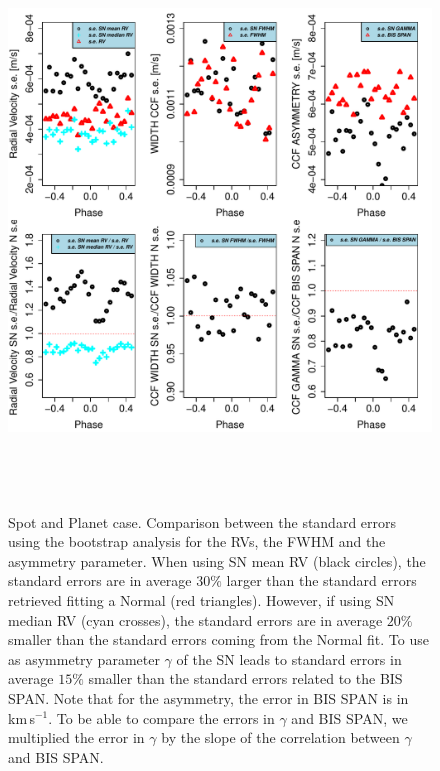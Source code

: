 \documentclass{aa}
\def\kms{\hbox{\,km\,s$^{-1}$}}       %
\begin{document}
\begin{figure}[htbp]
   \centering
\includegraphics[height = 6in]{RV_comparison_SPOT_PLANET_standard_errors.pdf} 
   \caption{Spot and Planet case. Comparison between the standard errors using the bootstrap analysis for the RVs, the FWHM and the asymmetry parameter. When using SN mean RV (black circles), the standard errors are in average $30\%$ larger than the standard errors retrieved fitting a Normal (red triangles). However, if using SN median RV (cyan crosses), the standard errors are in average $20\%$ smaller than the standard errors coming from the Normal fit. To use as asymmetry parameter $\gamma$ of the SN leads to standard errors in average $15\%$ smaller than the standard errors related to the BIS SPAN. Note that for the asymmetry, the error in BIS SPAN is in \kms. To be able to compare the errors in $\gamma$ and BIS SPAN, we multiplied the error in $\gamma$ by the slope of the correlation between $\gamma$ and BIS SPAN.}
   \label{fig:se.soap.spot.planet}
\end{figure}
\end{document}
